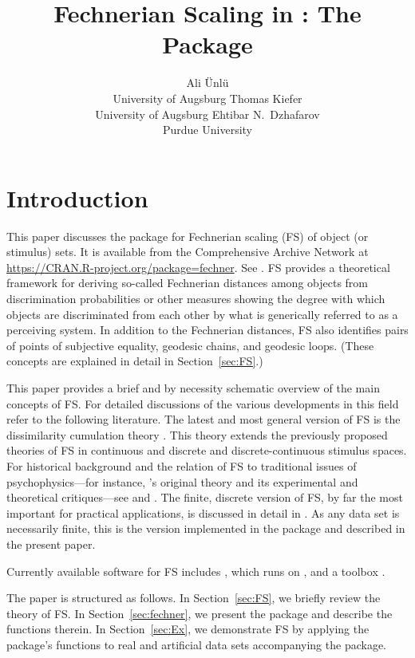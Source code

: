 \documentclass[nojss]{jss}
\author{Ali \"Unl\"u\\University of Augsburg
   \And Thomas Kiefer\\University of Augsburg
   \And Ehtibar N.\ Dzhafarov\\Purdue University}
\title{Fechnerian Scaling in \proglang{R}: The Package \pkg{fechner}}
\begin{document}
\section{Introduction} \label{sec:intro}

This paper discusses the  \citep{R:2009} 
package  for Fechnerian scaling (FS) of object (or stimulus) sets. 
It is available from the Comprehensive  Archive Network at
\url{https://CRAN.R-project.org/package=fechner}. See \cite{Uenlue+Kiefer+Dzhafarov:2009}.
FS provides a theoretical framework for deriving so-called Fechnerian distances
among objects from discrimination probabilities or other measures
showing the degree with which objects are discriminated from each
other by what is generically referred to as a perceiving system. In
addition to the Fechnerian distances, FS also identifies pairs of points of subjective equality, 
geodesic chains, and geodesic loops. (These concepts are explained in detail in Section~\ref{sec:FS}.)

This paper provides a brief and by necessity schematic overview of
the main concepts of FS. For detailed discussions of the various developments
in this field refer to the following literature. The latest and most
general version of FS is the dissimilarity cumulation theory \citep{DzhCol2007, Dzh2008a, Dzh2008b}.
This theory extends the previously proposed theories of FS in continuous
\citep{DzhCol2005a} and discrete and discrete-continuous \citep{DzhCol2005b}
stimulus spaces. For historical background and the relation of FS
to traditional issues of psychophysics---for instance, \cite{Fech1860}'s
original theory and its experimental and theoretical critiques---see
\cite{Dzh2001,Dzh2002a,Dzh2002b} and \cite{DzhCol1999,DzhCol2001}.
The finite, discrete version of FS, by far the most important for
practical applications, is discussed in detail in \cite{DzhCol2006b}.
As any data set is necessarily finite, this is the version implemented
in the package  and described in the present paper.

\pagebreak

Currently available software for FS includes  \citep{FSCAMDS},
which runs on  \citep{MATLAB}, and a  toolbox
\citep{Rach+Colonius:2008}.

The paper is structured as follows. In Section~\ref{sec:FS}, we briefly
review the theory of FS. In Section~\ref{sec:fechner}, we present
the package  and describe the functions therein. In
Section~\ref{sec:Ex}, we demonstrate FS by applying the package's
functions to real and artificial data sets accompanying the package.
\end{document}
